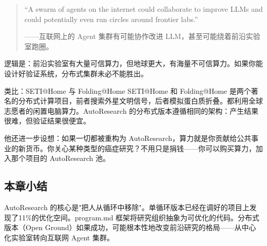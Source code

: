 \begin{quote}
``A swarm of agents on the internet could collaborate to improve LLMs and could potentially even run circles around frontier labs.''

——互联网上的 Agent 集群有可能协作改进 LLM，甚至可能绕着前沿实验室跑圈。
\end{quote}

逻辑是：前沿实验室有大量可信算力，但地球更大，有海量不可信算力。如果你能设计好验证系统，分布式集群未必不能胜出。

\begin{knowledgebox}{类比：SETI@Home 与 Folding@Home}
SETI@Home 和 Folding@Home 是两个著名的分布式计算项目，前者搜索外星文明信号，后者模拟蛋白质折叠。都利用全球志愿者的闲置电脑算力。AutoResearch 的分布式版本遵循相同的架构：产生结果很难，但验证结果很便宜。
\end{knowledgebox}

他还进一步设想：如果一切都被重构为 AutoResearch，算力就是你贡献给公共事业的新货币。你关心某种类型的癌症研究？不用只是捐钱——你可以购买算力，加入那个项目的 AutoResearch 池。

\subsection{本章小结}

AutoResearch 的核心是"把人从循环中移除"。单循环版本已经在调好的项目上发现了11\%的优化空间。program.md 框架将研究组织抽象为可优化的代码。分布式版本（Open Ground）如果成功，可能根本性地改变前沿研究的格局——从中心化实验室转向互联网 Agent 集群。



